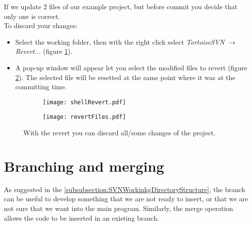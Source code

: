 If we update 2 files of our example project, but before commit you decide that only one is correct.\\

To discard your changes:


\begin{itemize}

    \item Select the working folder, then with the right click select \textit{TortoiseSVN} $\rightarrow$ \textit{Revert...} (figure \ref{fig:shellRevert}).
    
    \item A pop-up window will appear let you select the modified files to revert (figure \ref{fig:revertFiles}). The selected file will be resetted at the same point where it was at the committing time.

\end{itemize}




\begin{figure}[htbp]
\begin{subfigure}{0.5\textwidth}
  \centering
  \texttt{[image: shellRevert.pdf]}
  \caption{}
  \label{fig:shellRevert}
\end{subfigure}%
\begin{subfigure}{0.48\textwidth}
  \centering
  \texttt{[image: revertFiles.pdf]}
  \caption{}
  \label{fig:revertFiles}
\end{subfigure}
\caption{With the revert you can discard all/some changes of the project.}
\label{fig:svnRever}
\end{figure}


\newpage












\section{Branching and merging}
\label{sec:BranchingMerging}


As suggested in the \ref{subsubsection:SVNWorkinkgDirectoryStructure}, the branch can be useful to develop something that we are not ready to insert, or that we are not sure that we want into the main program. Similarly, the merge operation allows the code to be inserted in an existing branch. \newline


